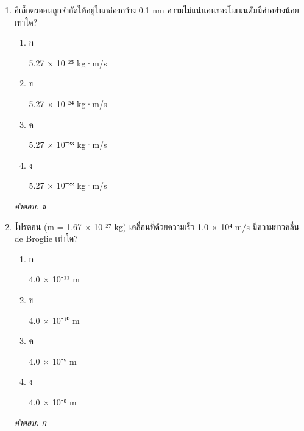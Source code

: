 \documentclass[12pt]{article}
\begin{document}
\begin{enumerate}[label=\arabic*., itemsep=0.5\baselineskip, topsep=0.5\baselineskip, leftmargin=*]
\item อิเล็กตรออนถูกจำกัดให้อยู่ในกล่องกว้าง 0.1 nm ความไม่แน่นอนของโมเมนตัมมีค่าอย่างน้อยเท่าใด?
\begin{enumerate}[label=\alph*)., itemsep=0.3\baselineskip, topsep=0.3\baselineskip]
\item ก\ 
\begin{minipage}[t]{0.9\linewidth}
\raggedright 5.27 × 10⁻²⁵ kg·m/s
\end{minipage}
\item ข\ 
\begin{minipage}[t]{0.9\linewidth}
\raggedright 5.27 × 10⁻²⁴ kg·m/s
\end{minipage}
\item ค\ 
\begin{minipage}[t]{0.9\linewidth}
\raggedright 5.27 × 10⁻²³ kg·m/s
\end{minipage}
\item ง\ 
\begin{minipage}[t]{0.9\linewidth}
\raggedright 5.27 × 10⁻²² kg·m/s
\end{minipage}
\end{enumerate}
\vspace{-0.3\baselineskip}
\begin{small}
\textit{คำตอบ: ข}
\end{small}

\item โปรตอน (m = 1.67 × 10⁻²⁷ kg) เคลื่อนที่ด้วยความเร็ว 1.0 × 10⁴ m/s มีความยาวคลื่น de Broglie เท่าใด?
\begin{enumerate}[label=\alph*)., itemsep=0.3\baselineskip, topsep=0.3\baselineskip]
\item ก\ 
\begin{minipage}[t]{0.9\linewidth}
\raggedright 4.0 × 10⁻¹¹ m
\end{minipage}
\item ข\ 
\begin{minipage}[t]{0.9\linewidth}
\raggedright 4.0 × 10⁻¹⁰ m
\end{minipage}
\item ค\ 
\begin{minipage}[t]{0.9\linewidth}
\raggedright 4.0 × 10⁻⁹ m
\end{minipage}
\item ง\ 
\begin{minipage}[t]{0.9\linewidth}
\raggedright 4.0 × 10⁻⁸ m
\end{minipage}
\end{enumerate}
\vspace{-0.3\baselineskip}
\begin{small}
\textit{คำตอบ: ก}
\end{small}


\end{enumerate}
\end{document}
